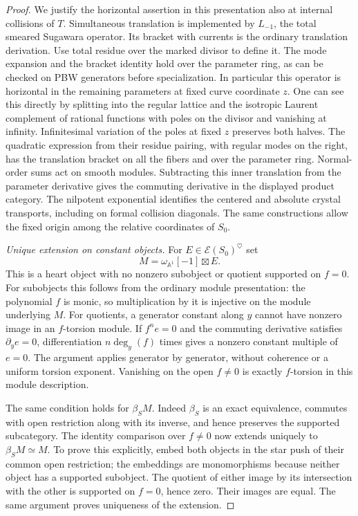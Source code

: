 \begin{proof}
We justify the horizontal assertion in this presentation also at
internal collisions of $T$.  Simultaneous translation is implemented
by $L_{-1}$, the total smeared Sugawara operator.  Its bracket with
currents is the ordinary translation derivation.  Use total residue
over the marked divisor to define it.  The mode expansion and the
bracket identity hold over the parameter ring, as can be checked on
PBW generators before specialization.  In particular this operator
is horizontal in the remaining parameters at fixed curve coordinate
$z$.  One can see this directly by splitting into the regular
lattice and the isotropic Laurent complement of rational functions
with poles on the divisor and vanishing at infinity.  Infinitesimal
variation of the poles at fixed $z$ preserves both halves.  The
quadratic expression from their residue pairing, with regular modes
on the right, has the translation bracket on all the fibers and
over the parameter ring.  Normal-order sums act on smooth modules.
Subtracting this inner translation from the parameter derivative
gives the commuting derivative in the displayed product category.
The nilpotent exponential identifies the centered and absolute
crystal transports, including on formal collision diagonals.
The same constructions allow the fixed origin among the relative
coordinates of $S_0$.

\smallskip
\noindent\emph{Unique extension on constant objects.}
For $E\in\mathcal E(S_0)^\heartsuit$ set
\[
                        M=\omega_{\mathbb A^1}[-1]\boxtimes E.
\]
This is a heart object with no nonzero subobject or quotient
supported on $f=0$.  For subobjects this follows from the ordinary
module presentation: the polynomial $f$ is monic, so multiplication
by it is injective on the module underlying $M$.  For quotients,
a generator constant along $y$ cannot have nonzero image in an
$f$-torsion module.  If $f^n e=0$ and the commuting derivative
satisfies $\partial_y e=0$, differentiation
$n\deg_y(f)$ times gives a nonzero constant multiple of $e=0$.
The argument applies generator by generator, without coherence
or a uniform torsion exponent.  Vanishing on the open $f\ne0$
is exactly $f$-torsion in this module description.

The same condition holds for $\beta_S M$.  Indeed $\beta_S$ is
an exact equivalence, commutes with open restriction along with
its inverse, and hence preserves the supported subcategory.
The identity comparison over $f\ne0$ now extends uniquely to
$\beta_S M\simeq M$.  To prove this explicitly, embed both
objects in the star push of their common open restriction; the
embeddings are monomorphisms because neither object has a
supported subobject.  The quotient of either image by its
intersection with the other is supported on $f=0$, hence zero.
Their images are equal.  The same argument proves uniqueness of
the extension.


\end{proof}
